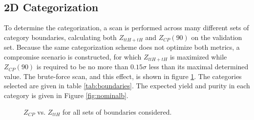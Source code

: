 \subsection{2D Categorization}

To determine the categorization, a scan is performed across many different sets of category boundaries, calculating both $Z_{ttH+tH}$ and $Z_{CP}(90)$ on the validation set. Because the same categorization scheme does not optimize both metrics, a compromise scenario is constructed, for which $Z_{ttH+tH}$ is maximized while $Z_{CP}(90)$ is required to be no more than $0.15\sigma$ less than its maximal determined value. The brute-force scan, and this effect, is shown in figure \ref{fig:optimal}. The categories selected are given in table \ref{tab:boundaries}. The expected yield and purity in each category is given in Figure \ref{fig:nominalb}.

\begin{figure}[htbp]
 \centering
  \caption{$Z_{CP}$ vs. $Z_{ttH}$ for all sets of boundaries considered.}
  \label{fig:optimal}
\end{figure}

